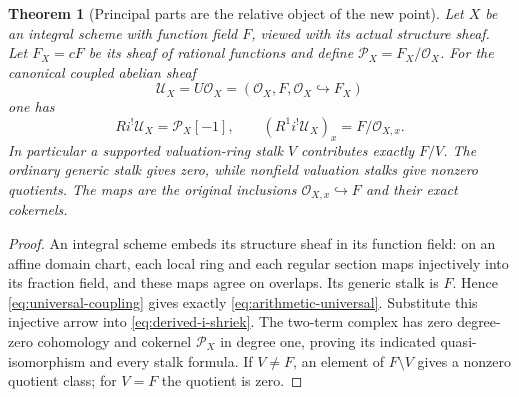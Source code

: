 \documentclass[11pt,a4paper]{article}
\newtheorem{theorem}{Theorem}[section]
\theoremstyle{definition}\newtheorem{definition}[theorem]{Definition}
\providecommand{\PP}{\mathcal P}
\begin{document}
\begin{theorem}[Principal parts are the relative object of the new point]
\label{thm:principal-parts}
Let $X$ be an integral scheme with function field $F$, viewed with its
actual structure sheaf. Let $F_X=cF$ be its sheaf of rational functions
and define $\PP_X=F_X/\mathcal O_X$. For the canonical coupled abelian
sheaf
\[
 \mathcal U_X=U\mathcal O_X=(\mathcal O_X,F,
                      \mathcal O_X\hookrightarrow F_X)
 \tag{RP21}\label{eq:arithmetic-universal}
\]
one has
\[
 Ri^!\mathcal U_X=\PP_X[-1],\qquad
 (R^1i^!\mathcal U_X)_x=F/\mathcal O_{X,x}.
 \tag{RP22}\label{eq:principal-parts-relative}
\]
In particular a supported valuation-ring stalk $V$ contributes exactly
$F/V$. The ordinary generic stalk gives zero, while nonfield valuation
stalks give nonzero quotients. The maps are the original inclusions
$\mathcal O_{X,x}\hookrightarrow F$ and their exact cokernels.
\end{theorem}
\begin{proof}
An integral scheme embeds its structure sheaf in its function field:
on an affine domain chart, each local ring and each regular section
maps injectively into its fraction field, and these maps agree on
overlaps. Its generic stalk is $F$. Hence
\eqref{eq:universal-coupling} gives exactly
\eqref{eq:arithmetic-universal}. Substitute this injective arrow into
\eqref{eq:derived-i-shriek}. The two-term complex has zero degree-zero
cohomology and cokernel $\PP_X$ in degree one, proving its indicated
quasi-isomorphism and every stalk formula. If $V\ne F$, an element
of $F\setminus V$ gives a nonzero quotient class; for $V=F$ the
quotient is zero.
\end{proof}
\end{document}
